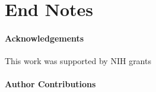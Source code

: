 
\section*{End Notes}

\paragraph{Acknowledgements} This work was supported by NIH grants \lipsum[7]

\paragraph{Author Contributions} \lipsum[8]

